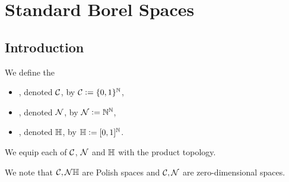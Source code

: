 \documentclass{book}
\begin{document}
	
	
	
	
	
	
	
	
	
	
	
	
	
	
	
	
	
	
	
	
	
	
	
	
	
	
	
	
	
	
	
	
	
	
	
	\newpage
	\chapter{Standard Borel Spaces}
	
	\section{Introduction}

	
	\begin{defn} 
		We define the 
		\begin{itemize}
			\item {}, denoted $\mathcal{C}$, by $\mathcal{C} \vcentcolon= \{0,1\}^{\mathbb{N}}$,
			\item {}, denoted $\mathcal{N}$, by $\mathcal{N} \vcentcolon= \mathbb{N}^{\mathbb{N}}$,
			\item {}, denoted $\mathbb{H}$, by $\mathbb{H} \vcentcolon= [0,1]^{\mathbb{N}}$.
		\end{itemize}
		We equip each of $\mathcal{C}$, $\mathcal{N}$ and $\mathbb{H}$ with the product topology.
	\end{defn}
	
	\begin{note}
		We note that  $\mathcal{C}, \mathcal{N} \mathbb{H}$ are Polish spaces and $\mathcal{C}, \mathcal{N}$ are zero-dimensional spaces.
	\end{note}
\end{document}
